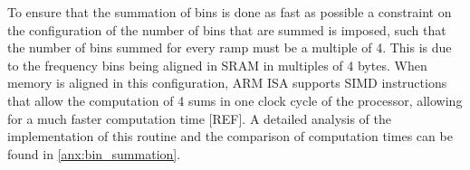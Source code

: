 To ensure that the summation of bins is done as fast as possible a constraint on the configuration of the number of bins that are summed is imposed, such that the number of bins summed for every ramp must be a multiple of 4. This is due to the frequency bins being aligned in SRAM in multiples of 4 bytes. When memory is aligned in this configuration, ARM ISA supports SIMD instructions that allow the computation of 4 sums in one clock cycle of the processor, allowing for a much faster computation time [REF]. A detailed analysis of the implementation of this routine and the comparison of computation times can be found in \cref{anx:bin_summation}.

%
%
%
%
%
%
%
%
%

